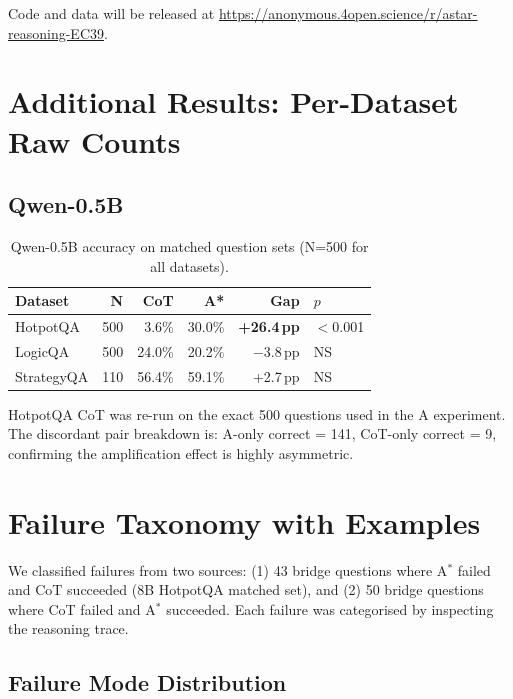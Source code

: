 \documentclass{article}
\newcommand{\astar}{A$^*$\xspace}
\begin{document}
Code and data will be released at \url{https://anonymous.4open.science/r/astar-reasoning-EC39}.

\section{Additional Results: Per-Dataset Raw Counts}
\label{app:raw}

\subsection{Qwen-0.5B}

\begin{table}[h]
\centering
\caption{Qwen-0.5B accuracy on matched question sets (N=500 for all datasets).}
\begin{tabular}{lrrrrl}
\toprule
Dataset & N & CoT & A* & Gap & $p$ \\
\midrule
HotpotQA   & 500 & 3.6\%  & 30.0\% & \textbf{+26.4\,pp} & $<$0.001 \\
LogicQA    & 500 & 24.0\% & 20.2\% & $-$3.8\,pp & NS \\
StrategyQA & 110 & 56.4\% & 59.1\% & +2.7\,pp   & NS \\
\bottomrule
\end{tabular}
\end{table}

HotpotQA CoT was re-run on the exact 500 questions used in the A\* experiment. The discordant pair breakdown is: A\*-only correct = 141, CoT-only correct = 9, confirming the amplification effect is highly asymmetric.

\section{Failure Taxonomy with Examples}
\label{app:failures}

We classified failures from two sources: (1) 43 bridge questions where \astar failed and CoT succeeded (8B HotpotQA matched set), and (2) 50 bridge questions where CoT failed and \astar succeeded. Each failure was categorised by inspecting the reasoning trace.

\subsection{Failure Mode Distribution}
\end{document}
